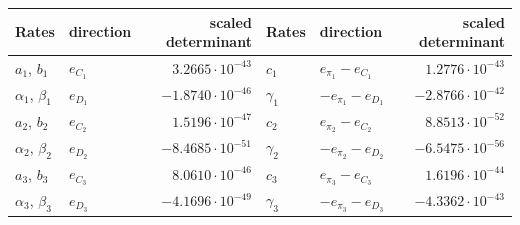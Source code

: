 \begin{tabular}{llr@{\qquad}llr}
\toprule
Rates & direction & scaled determinant & Rates & direction & scaled determinant\\
\midrule
$a_1$, $b_1$ & $e_{C_1}$ & $3.2665\cdot10^{-43}$ & $c_1$ & $e_{\pi_1}-e_{C_1}$ & $1.2776\cdot10^{-43}$\\
$\alpha_1$, $\beta_1$ & $e_{D_1}$ & $-1.8740\cdot10^{-46}$ & $\gamma_1$ & $-e_{\pi_1}-e_{D_1}$ & $-2.8766\cdot10^{-42}$\\
$a_2$, $b_2$ & $e_{C_2}$ & $1.5196\cdot10^{-47}$ & $c_2$ & $e_{\pi_2}-e_{C_2}$ & $8.8513\cdot10^{-52}$\\
$\alpha_2$, $\beta_2$ & $e_{D_2}$ & $-8.4685\cdot10^{-51}$ & $\gamma_2$ & $-e_{\pi_2}-e_{D_2}$ & $-6.5475\cdot10^{-56}$\\
$a_3$, $b_3$ & $e_{C_3}$ & $8.0610\cdot10^{-46}$ & $c_3$ & $e_{\pi_3}-e_{C_3}$ & $1.6196\cdot10^{-44}$\\
$\alpha_3$, $\beta_3$ & $e_{D_3}$ & $-4.1696\cdot10^{-49}$ & $\gamma_3$ & $-e_{\pi_3}-e_{D_3}$ & $-4.3362\cdot10^{-43}$\\
\bottomrule
\end{tabular}
